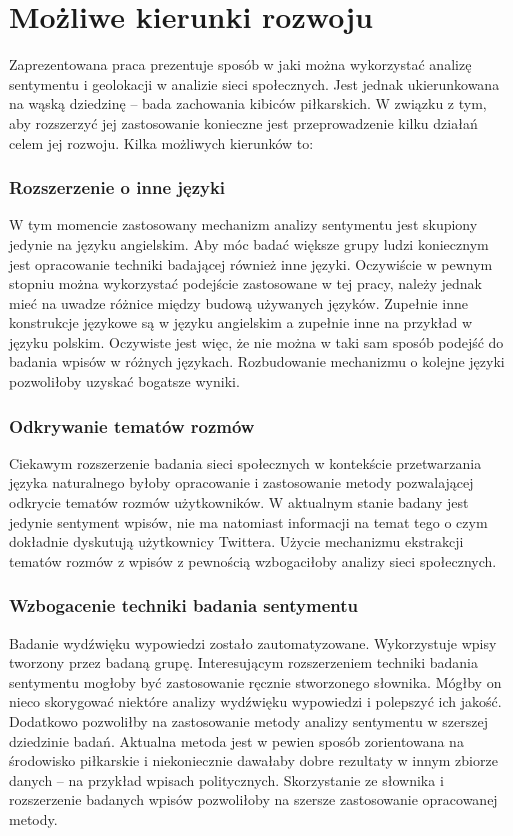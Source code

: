 \section{Możliwe kierunki rozwoju}

Zaprezentowana praca prezentuje sposób w jaki można wykorzystać
analizę sentymentu i geolokacji w analizie sieci społecznych. Jest jednak
ukierunkowana na wąską dziedzinę -- bada zachowania kibiców piłkarskich.
W związku z tym, aby rozszerzyć jej zastosowanie konieczne jest przeprowadzenie
kilku działań celem jej rozwoju. Kilka możliwych kierunków to:

\subsubsection{Rozszerzenie o inne języki}
W tym momencie zastosowany mechanizm analizy sentymentu jest skupiony jedynie na
języku angielskim. Aby móc badać większe grupy ludzi koniecznym jest opracowanie
techniki badającej również inne języki. Oczywiście w pewnym stopniu można 
wykorzystać podejście zastosowane w tej pracy, należy jednak mieć na uwadze
różnice między budową używanych języków. Zupełnie inne konstrukcje językowe
są w języku angielskim a zupełnie inne na przykład w języku polskim.
Oczywiste jest więc, że nie można w taki sam sposób podejść do badania
wpisów w różnych językach. Rozbudowanie mechanizmu o kolejne języki pozwoliłoby
uzyskać bogatsze wyniki.

\subsubsection{Odkrywanie tematów rozmów}
Ciekawym rozszerzenie badania sieci społecznych w kontekście przetwarzania
języka naturalnego byłoby opracowanie i zastosowanie metody pozwalającej
odkrycie tematów rozmów użytkowników. W aktualnym stanie badany jest jedynie
sentyment wpisów, nie ma natomiast informacji na temat tego o czym dokładnie
dyskutują użytkownicy Twittera. Użycie mechanizmu ekstrakcji tematów rozmów
z wpisów z pewnością wzbogaciłoby analizy sieci społecznych.


\subsubsection{Wzbogacenie techniki badania sentymentu}
Badanie wydźwięku wypowiedzi zostało zautomatyzowane. Wykorzystuje wpisy
tworzony przez badaną grupę. Interesującym rozszerzeniem techniki badania 
sentymentu mogłoby być zastosowanie ręcznie stworzonego słownika.
Mógłby on nieco skorygować niektóre analizy wydźwięku wypowiedzi i polepszyć
ich jakość. Dodatkowo pozwoliłby na zastosowanie metody analizy sentymentu
w szerszej dziedzinie badań. Aktualna metoda jest w pewien sposób zorientowana
na środowisko piłkarskie i niekoniecznie dawałaby dobre rezultaty w innym
zbiorze danych -- na przykład wpisach politycznych. Skorzystanie ze słownika
i rozszerzenie badanych wpisów pozwoliłoby na szersze zastosowanie opracowanej 
metody.

